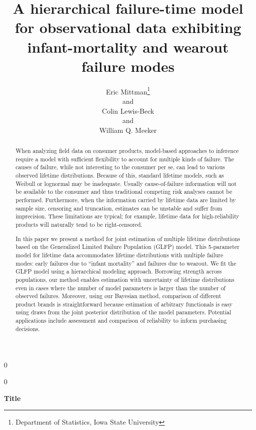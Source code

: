\documentclass[12pt]{article}
\newcommand{\blind}{0}
\begin{document}
\def\spacingset#1{\renewcommand{\baselinestretch}%
{#1}\small\normalsize} \spacingset{1}



\blind
{
  \title{\bf A hierarchical failure-time model for observational data exhibiting infant-mortality and wearout failure modes}
  \author{Eric Mittman\thanks{Department of Statistics, Iowa State University}\\
    and \\
    Colin Lewis-Beck\footnotemark[1]\\
    and \\
    William Q. Meeker\footnotemark[1]}
  \maketitle
} \fi

\blind
{
  \bigskip
  \bigskip
  \bigskip
  \begin{center}
    {\LARGE\bf Title}
\end{center}
  \medskip
} \fi

\begin{abstract}
When analyzing field data on consumer products, model-based approaches to inference require a model with sufficient flexibility to account for multiple kinds of failure. The causes of failure, while not interesting to the consumer per se, can lead to various observed lifetime distributions. Because of this, standard lifetime models, such as Weibull or lognormal may be inadequate. Usually cause-of-failure information will not be available to the consumer and thus traditional competing risk analyses cannot be performed.
Furthermore, when the information carried by lifetime data are limited by sample size, censoring and truncation, estimates can be unstable and suffer from imprecision. These limitations are typical; for example, lifetime data for high-reliability products will naturally tend to be right-censored.


In this paper we present a method for joint estimation of multiple lifetime distributions based on the Generalized Limited Failure Population (GLFP) model. This 5-parameter model for lifetime data accommodates lifetime distributions with multiple failure modes:  early failures due to ``infant mortality'' and failures due to wearout. We fit the GLFP model using a hierarchical modeling approach.  Borrowing strength across populations, our method enables estimation with uncertainty of lifetime distributions even in cases where the number of model parameters is larger than the number of observed failures.  Moreover, using our Bayesian method, comparison of different product brands is straightforward because estimation of arbitrary functionals is easy using draws from the joint posterior distribution of the model parameters. Potential applications include assessment and comparison of reliability to inform purchasing decisions.

\end{abstract}
\end{document}
